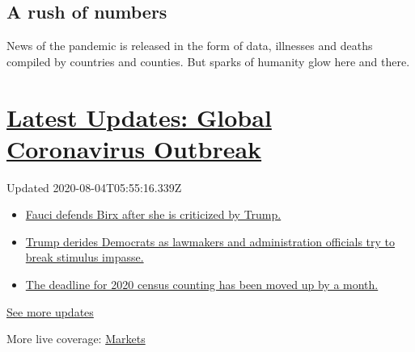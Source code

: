 \hypertarget{a-rush-of-numbers}{%
\subsection{A rush of numbers}\label{a-rush-of-numbers}}

News of the pandemic is released in the form of data, illnesses and
deaths compiled by countries and counties. But sparks of humanity glow
here and there.

\hypertarget{latest-updates-global-coronavirus-outbreak}{%
\section{\texorpdfstring{\href{https://www.nytimes.com/2020/08/03/world/coronavirus-covid-19.html?action=click\&pgtype=Article\&state=default\&region=MAIN_CONTENT_1\&context=storylines_live_updates}{Latest
Updates: Global Coronavirus
Outbreak}}{Latest Updates: Global Coronavirus Outbreak}}\label{latest-updates-global-coronavirus-outbreak}}

Updated 2020-08-04T05:55:16.339Z

\begin{itemize}
\tightlist
\item
  \href{https://www.nytimes.com/2020/08/03/world/coronavirus-covid-19.html?action=click\&pgtype=Article\&state=default\&region=MAIN_CONTENT_1\&context=storylines_live_updates\#link-4547638f}{Fauci
  defends Birx after she is criticized by Trump.}
\item
  \href{https://www.nytimes.com/2020/08/03/world/coronavirus-covid-19.html?action=click\&pgtype=Article\&state=default\&region=MAIN_CONTENT_1\&context=storylines_live_updates\#link-15e7f995}{Trump
  derides Democrats as lawmakers and administration officials try to
  break stimulus impasse.}
\item
  \href{https://www.nytimes.com/2020/08/03/world/coronavirus-covid-19.html?action=click\&pgtype=Article\&state=default\&region=MAIN_CONTENT_1\&context=storylines_live_updates\#link-e5a2cda}{The
  deadline for 2020 census counting has been moved up by a month.}
\end{itemize}

\href{https://www.nytimes.com/2020/08/03/world/coronavirus-covid-19.html?action=click\&pgtype=Article\&state=default\&region=MAIN_CONTENT_1\&context=storylines_live_updates}{See
more updates}

More live coverage:
\href{https://www.nytimes.com/live/2020/08/03/business/stock-market-today-coronavirus?action=click\&pgtype=Article\&state=default\&region=MAIN_CONTENT_1\&context=storylines_live_updates}{Markets}

